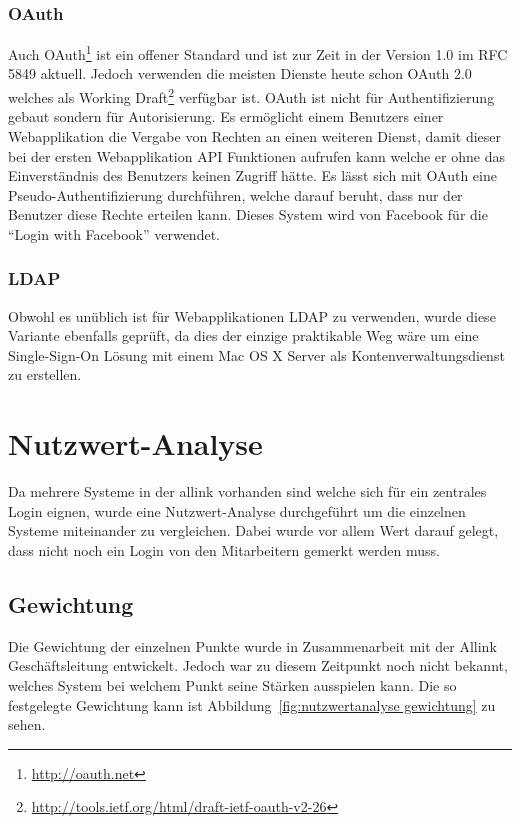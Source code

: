 \subsubsection{OAuth}
\label{ssub:OAuth}
Auch OAuth\footnote{\url{http://oauth.net}} ist ein offener Standard und ist zur Zeit in der Version 1.0 im RFC 5849\cite{rfc5849} aktuell. Jedoch verwenden die meisten Dienste heute schon OAuth 2.0 welches als Working Draft\footnote{\url{http://tools.ietf.org/html/draft-ietf-oauth-v2-26}} verfügbar ist. OAuth ist nicht für Authentifizierung gebaut sondern für Autorisierung. Es ermöglicht einem Benutzers einer Webapplikation die Vergabe von Rechten an einen weiteren Dienst, damit dieser bei der ersten Webapplikation API Funktionen aufrufen kann welche er ohne das Einverständnis des Benutzers keinen Zugriff hätte. Es lässt sich mit OAuth eine Pseudo-Authentifizierung durchführen, welche darauf beruht, dass nur der Benutzer diese Rechte erteilen kann. Dieses System wird von Facebook für die ``Login with Facebook'' verwendet.

\subsubsection{LDAP}
\label{ssub:LDAP}
Obwohl es unüblich ist für Webapplikationen LDAP\cite{rfc4511} zu verwenden, wurde diese Variante ebenfalls geprüft, da dies der einzige praktikable Weg wäre um eine Single-Sign-On Lösung mit einem Mac OS X Server als Kontenverwaltungsdienst zu erstellen.

\section{Nutzwert-Analyse}
\label{sec:Nutzwert-Analyse}
Da mehrere Systeme in der allink vorhanden sind welche sich für ein zentrales Login eignen, wurde eine Nutzwert-Analyse durchgeführt um die einzelnen Systeme miteinander zu vergleichen. Dabei wurde vor allem Wert darauf gelegt, dass nicht noch ein Login von den Mitarbeitern gemerkt werden muss.

\subsection{Gewichtung}
\label{sub:Gewichtung}
Die Gewichtung der einzelnen Punkte wurde in Zusammenarbeit mit der Allink Geschäftsleitung entwickelt. Jedoch war zu diesem Zeitpunkt noch nicht bekannt, welches System bei welchem Punkt seine Stärken ausspielen kann. Die so festgelegte Gewichtung kann ist Abbildung~\ref{fig:nutzwertanalyse gewichtung} zu sehen.


